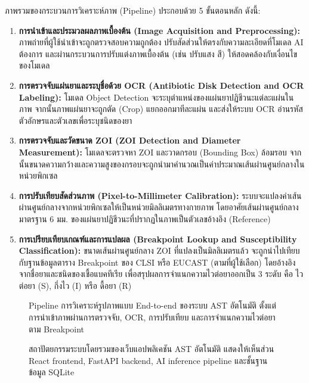 ภาพรวมของกระบวนการวิเคราะห์ภาพ (Pipeline) ประกอบด้วย 5 ขั้นตอนหลัก ดังนี้:
\begin{enumerate}
  \item \textbf{การนำเข้าและประมวลผลภาพเบื้องต้น (Image Acquisition and Preprocessing):} ภาพถ่ายที่ผู้ใช้นำเข้าจะถูกตรวจสอบความถูกต้อง ปรับสัดส่วนให้ตรงกับความละเอียดที่โมเดล AI ต้องการ และผ่านกระบวนการปรับแต่งภาพเบื้องต้น (เช่น ปรับแสง สี) ให้สอดคล้องกับเงื่อนไขของโมเดล
  \item \textbf{การตรวจจับแผ่นยาและระบุชื่อด้วย OCR (Antibiotic Disk Detection and OCR Labeling):} โมเดล Object Detection จะระบุตำแหน่งของแผ่นยาปฏิชีวนะแต่ละแผ่นในภาพ จากนั้นภาพแผ่นยาจะถูกตัด (Crop) แยกออกมาทีละแผ่น และส่งให้ระบบ OCR อ่านรหัสตัวอักษรและตัวเลขเพื่อระบุชนิดของยา
  \item \textbf{การตรวจจับและวัดขนาด ZOI (ZOI Detection and Diameter Measurement):} โมเดลจะตรวจหา ZOI และวาดกรอบ (Bounding Box) ล้อมรอบ จากนั้นขนาดความกว้างและความสูงของกรอบจะถูกนำมาคำนวณเป็นค่าประมาณเส้นผ่านศูนย์กลางในหน่วยพิกเซล
  \item \textbf{การปรับเทียบสัดส่วนภาพ (Pixel-to-Millimeter Calibration):} ระบบจะแปลงค่าเส้นผ่านศูนย์กลางจากหน่วยพิกเซลให้เป็นหน่วยมิลลิเมตรทางกายภาพ โดยอาศัยเส้นผ่านศูนย์กลางมาตรฐาน 6 มม. ของแผ่นยาปฏิชีวนะที่ปรากฏในภาพเป็นตัวเลขอ้างอิง (Reference)
  \item \textbf{การเปรียบเทียบเกณฑ์และการแปลผล (Breakpoint Lookup and Susceptibility Classification):} ขนาดเส้นผ่านศูนย์กลาง ZOI ที่แปลงเป็นมิลลิเมตรแล้ว จะถูกนำไปเทียบกับฐานข้อมูลตาราง Breakpoint ของ CLSI หรือ EUCAST (ตามที่ผู้ใช้เลือก) โดยอ้างอิงจากชื่อยาและชนิดของเชื้อแบคทีเรีย เพื่อสรุปผลการจำแนกความไวต่อยาออกเป็น 3 ระดับ คือ ไวต่อยา (S), กึ่งไว (I) หรือ ดื้อยา (R)
\end{enumerate}

\begin{figure}[H]
  \centering
  \caption{Pipeline การวิเคราะห์รูปภาพแบบ End-to-end ของระบบ AST อัตโนมัติ ตั้งแต่การนำเข้าภาพผ่านการตรวจจับ, OCR, การปรับเทียบ และการจำแนกความไวต่อยาตาม Breakpoint}
  \label{fig:pipeline}
\end{figure}

\begin{figure}[H]
  \centering
  \caption{สถาปัตยกรรมระบบโดยรวมของเว็บแอปพลิเคชัน AST อัตโนมัติ แสดงให้เห็นส่วน React frontend, FastAPI backend, AI inference pipeline และชั้นฐานข้อมูล SQLite}
  \label{fig:sys_arch}
\end{figure}

